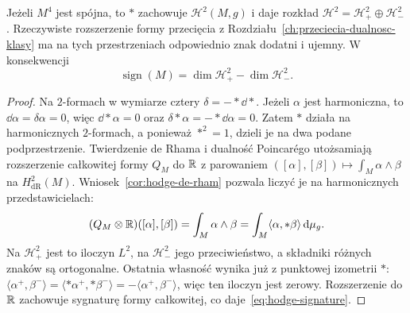 \begin{stwierdzenie}
\label{prop:hodge-signature}
Jeżeli $M^4$ jest spójna, to $*$ zachowuje
$\mathcal H^2(M,g)$ i daje rozkład
$\mathcal H^2=\mathcal H^2_+\oplus\mathcal H^2_-$.
Rzeczywiste rozszerzenie formy przecięcia z
Rozdziału~\ref{ch:przeciecia-dualnosc-klasy}
ma na tych przestrzeniach odpowiednio znak dodatni
i ujemny. W konsekwencji
\begin{equation}\label{eq:hodge-signature}
 \operatorname{sign}(M)
 =\dim\mathcal H^2_+-\dim\mathcal H^2_-.
\end{equation}
\end{stwierdzenie}
\begin{proof}
Na $2$-formach w wymiarze cztery
$\delta=-*\dd*$. Jeżeli $\alpha$ jest harmoniczna,
to $\dd\alpha=\delta\alpha=0$, więc
$\dd*\alpha=0$ oraz $\delta*\alpha=-*\dd\alpha=0$.
Zatem $*$ działa na harmonicznych $2$-formach, a
ponieważ $*^2=1$, dzieli je na dwa podane podprzestrzenie.
Twierdzenie de Rhama i dualność Poincarégo
utożsamiają rozszerzenie całkowitej formy
$Q_M$ do $\mathbb{R}$ z parowaniem
$([\alpha],[\beta])\mapsto\int_M\alpha\wedge\beta$
na $H^2_{\mathrm{dR}}(M)$. Wniosek~\ref{cor:hodge-de-rham}
pozwala liczyć je na harmonicznych przedstawicielach:
\[
 (Q_M\otimes\mathbb{R})([\alpha],[\beta])=\int_M\alpha\wedge\beta
 =\int_M\langle\alpha,*\beta\rangle\,\mathrm d\mu_g.
\]
Na $\mathcal H^2_+$ jest to iloczyn $L^2$, na
$\mathcal H^2_-$ jego przeciwieństwo, a składniki
różnych znaków są ortogonalne.
Ostatnia własność wynika już z punktowej izometrii $*$:
$\langle\alpha^+,\beta^-\rangle
=\langle*\alpha^+,*\beta^-\rangle
=-\langle\alpha^+,\beta^-\rangle$, więc ten iloczyn jest zerowy.
Rozszerzenie do $\mathbb{R}$
zachowuje sygnaturę formy całkowitej, co
daje~\eqref{eq:hodge-signature}.
\end{proof}


